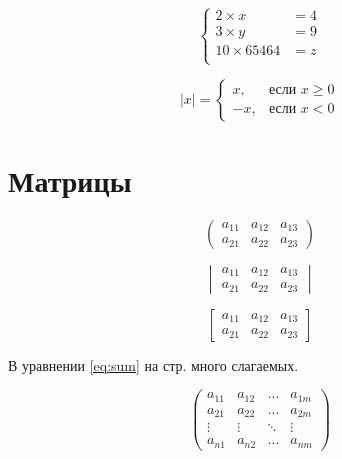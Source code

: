 \documentclass[a4paper,12pt]{article} %
\begin{document}
\[
	\left\{
		\begin{aligned}
			2\times x &= 4  \\
			3\times y &= 9\\
			10 \times 65464 &= z\\
		\end{aligned}
	\right.
\]

\[
	|x|=\begin{cases}
		x, &\text{если }  x \ge 0 \\
		-x, &\text{если } x<0
	\end{cases}
\]

\section{Матрицы}

\[
	\begin{pmatrix}
		a_{11} & a_{12} & a_{13} \\
		a_{21} & a_{22} & a_{23}
	\end{pmatrix}
\]

\[
	\begin{vmatrix}
		a_{11} & a_{12} & a_{13} \\
		a_{21} & a_{22} & a_{23}
	\end{vmatrix}
\]

\[
	\begin{bmatrix}
		a_{11} & a_{12} & a_{13} \\
		a_{21} & a_{22} & a_{23}
	\end{bmatrix}
\]

В уравнении \eqref{eq:sum} на стр. \pageref{eq:sum} много слагаемых.

\[ 
\begin{pmatrix} 
a_{11} & a_{12} & \ldots & a_{1m}\\ 
a_{21} & a_{22} & \ldots & a_{2m}\\ 
\vdots & \vdots & \ddots & \vdots\\ 
a_{n1} & a_{n2} & \ldots & a_{nm} 
\end{pmatrix} 
\] 
\end{document}
